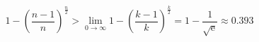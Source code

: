 \begin{equation}
1 - \left(\frac{n-1}{n}\right)^{\frac{n}{2}} > \lim_{0 \to \infty} 1 - \left(\frac{k-1}{k}\right)^{\frac{k}{2}} = 1 - \frac{1}{\sqrt{{\mathrm{e}}}} \approx 0.393
\end{equation}

